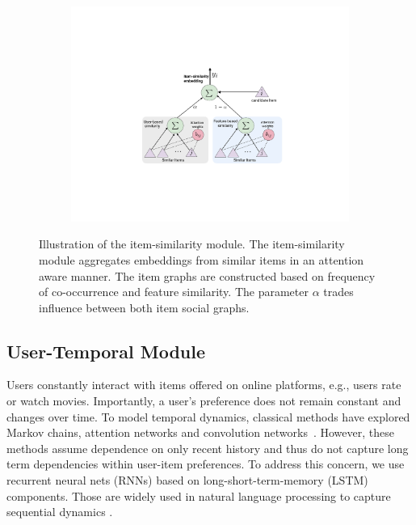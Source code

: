 \begin{figure}[tbh]
\begin{subfigure}[c]{\linewidth}
\centering
  \includegraphics[scale=0.75]{figures/ItemModule_new}
  \label{fig:item}
\end{subfigure}
\caption{Illustration of the item-similarity module. The item-similarity module aggregates embeddings from similar items in an attention aware manner. The item graphs are constructed based on frequency of co-occurrence and feature similarity. The parameter $\alpha$ trades influence between both item social graphs.}
\end{figure}

\subsection{User-Temporal Module}
Users constantly interact with items offered on online platforms, e.g., users rate or watch movies. Importantly, a user's preference does not remain constant and changes over time.
To model temporal dynamics, classical methods have explored Markov chains, attention networks and convolution networks~\cite{FPMC, SAS:2018, Caser}. However, these methods assume dependence on only recent history and  thus do not capture long term dependencies within user-item preferences. To address this concern, we  use recurrent neural nets (RNNs) based on long-short-term-memory (LSTM) components. Those are widely used in natural language processing to capture sequential dynamics \cite{recurrent}.

